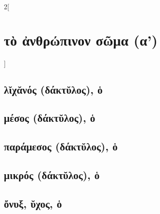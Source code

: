 \documentclass{book}
\begin{document}
\begin{multicols}{2}[\section{τὸ ἀνθρώπινον σῶμα (α')}]
\subsection{λῐχᾰνός (δάκτῠλος), ὁ}
\subsection{μέσος (δάκτῠλος), ὁ}
\subsection{παράμεσος (δάκτῠλος), ὁ}
\subsection{μικρός (δάκτῠλος), ὁ}
\subsection{ὄνυξ, ῠχος, ὁ}
~

\end{multicols}
\newpage
\end{document}
